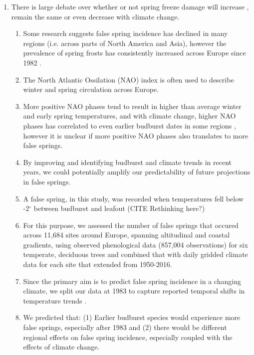 \documentclass{article}\usepackage[]{graphicx}\usepackage[]{color}
\begin{document}
\begin{enumerate}
\item There is large debate over whether or not spring freeze damage will increase \citep{Hannenin1991, Augspurger2013, Labe2016}, remain the same \citep{Scheifinger2003} or even decrease \citep{Kramer1994} with climate change.
\begin{enumerate}
\item Some research suggests false spring incidence has declined in many regions (i.e. across parts of North America and Asia), however the prevalence of spring frosts has consistently increased across Europe since 1982 \citep{Liu2018}.
\item The North Atlantic Ossilation (NAO) index is often used to describe winter and spring circulation across Europe. 
\item More positive NAO phases tend to result in higher than average winter and early spring temperatures, and with climate change, higher NAO phases has correlated to even earlier budburst dates in some regions \citep{Chmielewski2001}, however it is unclear if more positive NAO phases also translates to more false springs.
\item By improving and identifying budburst and climate trends in recent years, we could potentially amplify our predictability of future projections in false springs.
\item A false spring, in this study, was recorded when temperatures fell below -2$^{\circ}$ \citep{Schwartz1993} between budburst and leafout (CITE Rethinking here?)
\item For this purpose, we assessed the number of false springs that occured across 11,684 sites around Europe, spanning altitudinal and coastal gradients, using observed phenological data (857,004 observations) for six temperate, deciduous trees and combined that with daily gridded climate data for each site that extended from 1950-2016. %
\item Since the primary aim is to predict false spring incidence in a changing climate, we split our data at 1983 to capture reported temporal shifts in temperature trends \citep{Stocker2013, Kharouba2018}.
\item We predicted that: (1) Earlier budburst species would experience more false springs, especially after 1983 and (2) there would be different regional effects on false spring incidence, especially coupled with the effects of climate change.
\end{enumerate}
\end{enumerate}
\end{document}
